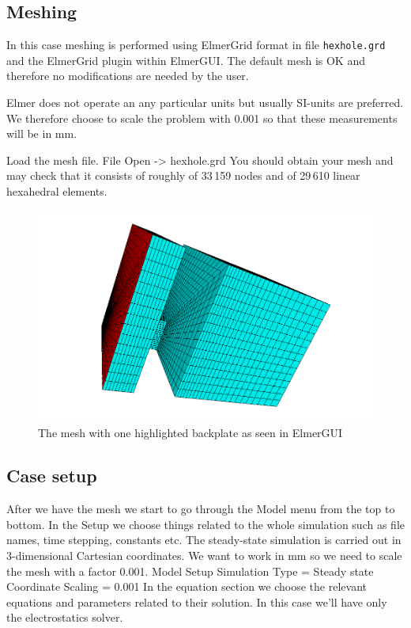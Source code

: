 \subsection*{Meshing}

In this case meshing is performed using ElmerGrid format in file \texttt{hexhole.grd} and the ElmerGrid plugin within ElmerGUI. 
The default mesh is OK and therefore no modifications are needed by the user. 

Elmer does not operate an any particular units but usually SI-units 
are preferred. We therefore choose to scale the problem with 0.001 so that these measurements will be in mm.  

Load the mesh file.
\ttbegin
File 
  Open -> hexhole.grd
\ttend
You should obtain your mesh and may check that it consists of roughly of 33\,159 nodes and of 
29\,610 linear hexahedral elements.


\begin{figure}[h]
\centering
\includegraphics[width=140mm]{HexholeElmerGUI}
\caption{The mesh with one highlighted backplate as seen in ElmerGUI}\label{fg:hexhole_elmergui}
\end{figure}  


\subsection*{Case setup}

After we have the mesh we start to go through the Model menu from the top to bottom. 
In the Setup we choose things related to the whole simulation such as file names, 
time stepping, constants etc.
The steady-state simulation is carried out in 3-dimensional Cartesian
coordinates. We want to work in mm so we need to scale the mesh with a factor 0.001. 
\ttbegin
Model
  Setup 
    Simulation Type = Steady state
    Coordinate Scaling = 0.001
\ttend
In the equation section we choose the relevant equations and parameters related to their solution. 
In this case we'll have only the electrostatics solver. 

